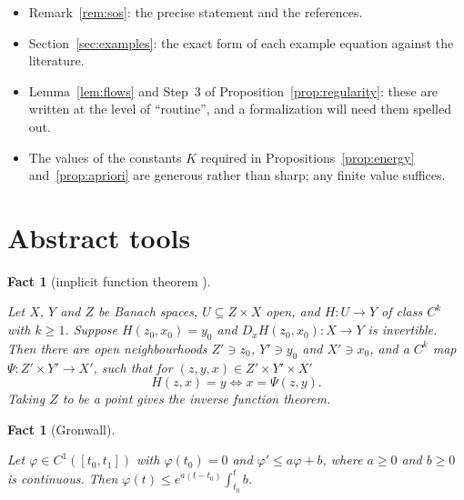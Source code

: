 \documentclass[11pt,reqno]{amsart}
\newtheorem{fact}[theorem]{Fact}
\theoremstyle{definition}
\theoremstyle{remark}
\newcommand{\source}[1]{}
\numberwithin{equation}{section}
\begin{document}
\begin{itemize}[nosep]
\item Remark~\ref{rem:sos}: the precise statement and the references.
\item Section~\ref{sec:examples}: the exact form of each example equation against the literature.
\item Lemma~\ref{lem:flows} and Step~3 of Proposition~\ref{prop:regularity}: these are written at the
  level of ``routine'', and a formalization will need them spelled out.
\item The values of the constants $K$ required in Propositions~\ref{prop:energy}
  and~\ref{prop:apriori} are generous rather than sharp; any finite value suffices.
\end{itemize}

\appendix
\section{Abstract tools}\label{app:abstract}

\begin{fact}[implicit function theorem {\cite{Lang}}]\label{fact:ift}
\source{Mathlib: HasStrictFDerivAt.implicitFunction, ContDiffAt.to_localInverse}
Let $X$, $Y$ and $Z$ be Banach spaces, $U\subseteq Z\times X$ open, and $H\colon U\to Y$ of class
$C^k$ with $k\ge1$. Suppose $H(z_0,x_0)=y_0$ and $D_xH(z_0,x_0)\colon X\to Y$ is invertible. Then
there are open neighbourhoods $Z'\ni z_0$, $Y'\ni y_0$ and $X'\ni x_0$, and a $C^k$ map
$\Psi\colon Z'\times Y'\to X'$, such that for $(z,y,x)\in Z'\times Y'\times X'$
\[
  H(z,x)=y\iff x=\Psi(z,y).
\]
Taking $Z$ to be a point gives the inverse function theorem.
\end{fact}

\begin{fact}[Gronwall]\label{fact:gronwall}
\source{Mathlib: norm_le_gronwallBound_of_norm_deriv_right_le}
Let $\varphi\in C^1([t_0,t_1])$ with $\varphi(t_0)=0$ and $\varphi'\le a\varphi+b$, where $a\ge0$ and
$b\ge0$ is continuous. Then $\varphi(t)\le e^{a(t-t_0)}\int_{t_0}^tb$.
\end{fact}
\end{document}

